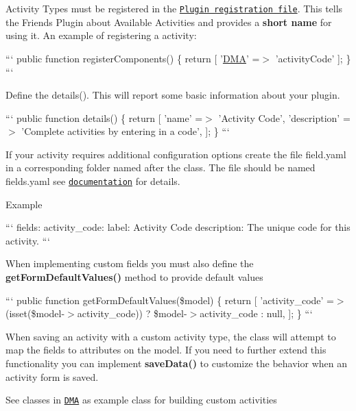 Activity Types must be registered in the \href{#registration-file}{\tt Plugin registration file}. This tells the Friends Plugin about Available Activities and provides a {\bfseries short name} for using it. An example of registering a activity\-:

``` public function register\-Components() \{ return \mbox{[} '\hyperlink{namespaceDMA}{D\-M\-A}' =$>$ 'activity\-Code' \mbox{]}; \} ```

Define the details(). This will report some basic information about your plugin.

``` public function details() \{ return \mbox{[} 'name' =$>$ 'Activity Code', 'description' =$>$ 'Complete activities by entering in a code', \mbox{]}; \} ```

If your activity requires additional configuration options create the file field.\-yaml in a corresponding folder named after the class. The file should be named fields.\-yaml see \href{https://octobercms.com/docs/backend/forms#field-types}{\tt documentation} for details.

Example

``` fields\-: activity\-\_\-code\-: label\-: Activity Code description\-: The unique code for this activity. ```

When implementing custom fields you must also define the {\bfseries get\-Form\-Default\-Values()} method to provide default values

``` public function get\-Form\-Default\-Values(\$model) \{ return \mbox{[} 'activity\-\_\-code' =$>$ (isset(\$model-\/$>$activity\-\_\-code)) ? \$model-\/$>$activity\-\_\-code \-: null, \mbox{]}; \} ```

When saving an activity with a custom activity type, the class will attempt to map the fields to attributes on the model. If you need to further extend this functionality you can implement {\bfseries save\-Data()} to customize the behavior when an activity form is saved.

See classes in \href{https://github.com/DallasMuseumArt/OctoberFriends/tree/master/activities}{\tt D\-M\-A} as example class for building custom activities 